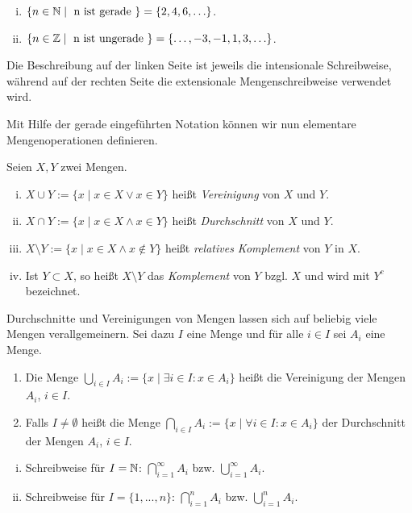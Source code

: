 \begin{example}
    \begin{enumerate}[(i)]
        \item
        $\{n \in \mathbb{N} \mid \text{ n ist gerade } \} = \{2,4,6,\ldots\}$.
        \item
        $\{n \in \mathbb{Z} \mid \text{ n ist ungerade } \} = \{\ldots,-3,-1,1,3,\ldots\}$.
    \end{enumerate}
Die Beschreibung auf der linken Seite ist jeweils die intensionale Schreibweise,
während auf der rechten Seite die extensionale Mengenschreibweise verwendet wird.
\end{example}

Mit Hilfe der gerade eingeführten Notation können wir nun elementare
Mengenoperationen definieren.

\begin{mydef}
Seien $X,Y$ zwei Mengen.
    \begin{enumerate}[(i)]
        \item
        $X \cup Y := \{x \mid x \in X \vee x \in Y\}$ heißt \textit{Vereinigung} von $X$ und $Y$.
        \item
        $X \cap Y := \{x \mid x \in X \wedge x \in Y\}$ heißt \textit{Durchschnitt} von $X$ und $Y$.
        \item
        $X \setminus Y := \{x \mid x \in X \wedge x \notin Y\}$ heißt \textit{relatives Komplement} von $Y$ in $X$.
        \item
        Ist $Y \subset X$, so heißt $X \setminus Y$ das \textit{Komplement} von $Y$ bzgl. $X$ und wird mit $Y^c$ bezeichnet.
    \end{enumerate}
\end{mydef}

\begin{mydef}
Durchschnitte und Vereinigungen von Mengen lassen sich auf beliebig viele
Mengen verallgemeinern.
Sei dazu $I$ eine Menge und für alle $i \in I$ sei $A_i$ eine Menge.
\begin{enumerate}
        \item
        Die Menge $\bigcup_{i \in I}A_i := \{x \mid \exists i \in I: x \in A_i\}$ heißt die Vereinigung der Mengen $A_i$, $i \in I$.
        \item
        Falls $I \neq \emptyset$ heißt die Menge $\bigcap_{i \in I}A_i := \{x \mid \forall i \in I: x \in A_i\}$  der Durchschnitt der Mengen $A_i$, $i \in I$.

    \end{enumerate}
\end{mydef}

\begin{remark}
    \begin{enumerate}[(i)]
        \item
        Schreibweise für $I = \mathbb{N}$: $\bigcap_{i=1}^{\infty}A_i$ bzw. $\bigcup_{i=1}^{\infty}A_i$.
        \item
        Schreibweise für $I = \{1,...,n\}$: $\bigcap_{i=1}^n A_i$ bzw. $\bigcup_{i=1}^n A_i$.
    \end{enumerate}
\end{remark}
